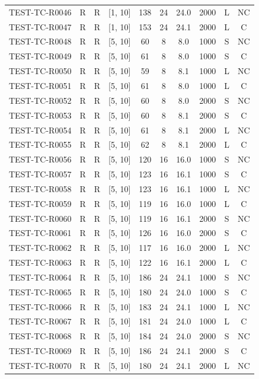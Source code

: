 \begin{longtable}{lccccccccc}
TEST-TC-R0046 & R & R & [1, 10] & 138 & 24 & 24.0 & 2000 & L & NC \\
TEST-TC-R0047 & R & R & [1, 10] & 153 & 24 & 24.1 & 2000 & L & C \\
TEST-TC-R0048 & R & R & [5, 10] & 60 & 8 & 8.0 & 1000 & S & NC \\
TEST-TC-R0049 & R & R & [5, 10] & 61 & 8 & 8.0 & 1000 & S & C \\
TEST-TC-R0050 & R & R & [5, 10] & 59 & 8 & 8.1 & 1000 & L & NC \\
TEST-TC-R0051 & R & R & [5, 10] & 61 & 8 & 8.0 & 1000 & L & C \\
TEST-TC-R0052 & R & R & [5, 10] & 60 & 8 & 8.0 & 2000 & S & NC \\
TEST-TC-R0053 & R & R & [5, 10] & 60 & 8 & 8.1 & 2000 & S & C \\
TEST-TC-R0054 & R & R & [5, 10] & 61 & 8 & 8.1 & 2000 & L & NC \\
TEST-TC-R0055 & R & R & [5, 10] & 62 & 8 & 8.1 & 2000 & L & C \\
TEST-TC-R0056 & R & R & [5, 10] & 120 & 16 & 16.0 & 1000 & S & NC \\
TEST-TC-R0057 & R & R & [5, 10] & 123 & 16 & 16.1 & 1000 & S & C \\
TEST-TC-R0058 & R & R & [5, 10] & 123 & 16 & 16.1 & 1000 & L & NC \\
TEST-TC-R0059 & R & R & [5, 10] & 119 & 16 & 16.0 & 1000 & L & C \\
TEST-TC-R0060 & R & R & [5, 10] & 119 & 16 & 16.1 & 2000 & S & NC \\
TEST-TC-R0061 & R & R & [5, 10] & 126 & 16 & 16.0 & 2000 & S & C \\
TEST-TC-R0062 & R & R & [5, 10] & 117 & 16 & 16.0 & 2000 & L & NC \\
TEST-TC-R0063 & R & R & [5, 10] & 122 & 16 & 16.1 & 2000 & L & C \\
TEST-TC-R0064 & R & R & [5, 10] & 186 & 24 & 24.1 & 1000 & S & NC \\
TEST-TC-R0065 & R & R & [5, 10] & 180 & 24 & 24.0 & 1000 & S & C \\
TEST-TC-R0066 & R & R & [5, 10] & 183 & 24 & 24.1 & 1000 & L & NC \\
TEST-TC-R0067 & R & R & [5, 10] & 181 & 24 & 24.0 & 1000 & L & C \\
TEST-TC-R0068 & R & R & [5, 10] & 184 & 24 & 24.0 & 2000 & S & NC \\
TEST-TC-R0069 & R & R & [5, 10] & 186 & 24 & 24.1 & 2000 & S & C \\
TEST-TC-R0070 & R & R & [5, 10] & 180 & 24 & 24.1 & 2000 & L & NC \\

\end{longtable}
